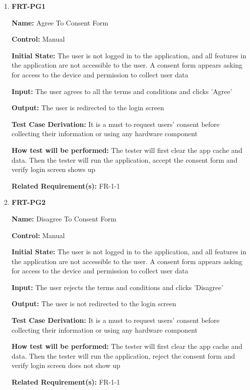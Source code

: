 \documentclass[12pt, titlepage]{article}
\begin{document}
\begin{enumerate}

\item{\textbf{FRT-PG1}}

\textbf{Name:} Agree To Consent Form

\textbf{Control:} Manual
					
\textbf{Initial State:} The user is not logged in to the application, and all features in the application are not accessible to the user. A consent form appears asking for access to the device and permission to collect user data

\textbf{Input:} The user agrees to all the terms and conditions and clicks 'Agree'
					
\textbf{Output:} The user is redirected to the login screen

\textbf{Test Case Derivation:} It is a must to request users' consent before collecting their information or using any hardware component
					
\textbf{How test will be performed:} The tester will first clear the app cache and data. Then the tester will run the application, accept the consent form and verify login screen shows up

\textbf{Related Requirement(s):} FR-1-1
					
\item{\textbf{FRT-PG2}}

\textbf{Name:} Disagree To Consent Form

\textbf{Control:} Manual
					
\textbf{Initial State:} The user is not logged in to the application, and all features in the application are not accessible to the user. A consent form appears asking for access to the device and permission to collect user data
					
\textbf{Input:} The user rejects the terms and conditions and clicks 'Disagree'
					
\textbf{Output:} The user is not redirected to the login screen

\textbf{Test Case Derivation:} It is a must to request users' consent before collecting their information or using any hardware component

\textbf{How test will be performed:} The tester will first clear the app cache and data. Then the tester will run the application, reject the consent form and verify login screen does not show up

\textbf{Related Requirement(s):} FR-1-1

\end{enumerate}
\end{document}
